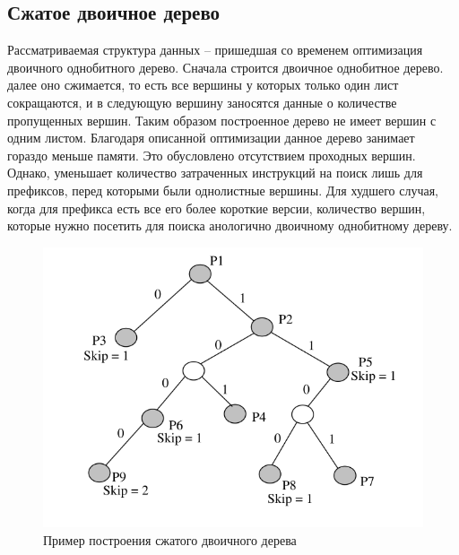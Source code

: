 \documentclass[a4peper, 12pt, titlepage, finall]{report}
\begin{document}
        \subsection{Сжатое двоичное дерево}
            Рассматриваемая структура данных -- пришедшая со временем оптимизация двоичного однобитного дерево. Сначала строится двоичное однобитное дерево.
            далее оно сжимается, то есть все вершины у которых только один лист сокращаются, и в следующую вершину заносятся данные о 
            количестве пропущенных вершин. Таким образом построенное дерево не имеет вершин с одним листом. Благодаря описанной оптимизации данное дерево
            занимает гораздо меньше памяти. Это обусловлено отсутствием проходных вершин. Однако, уменьшает количество затраченных инструкций на поиск лишь 
            для префиксов, перед которыми были однолистные вершины. Для худшего случая, когда для префикса есть все его более короткие версии, количество вершин, 
            которые нужно посетить для поиска анологично двоичному однобитному дереву.

            \begin{figure}[h]
                \includegraphics[width=\textwidth]{patricia_trie.png}
                \caption{Пример построения сжатого двоичного дерева}
                \label{fig:mesh2}
            \end{figure}
\end{document}
